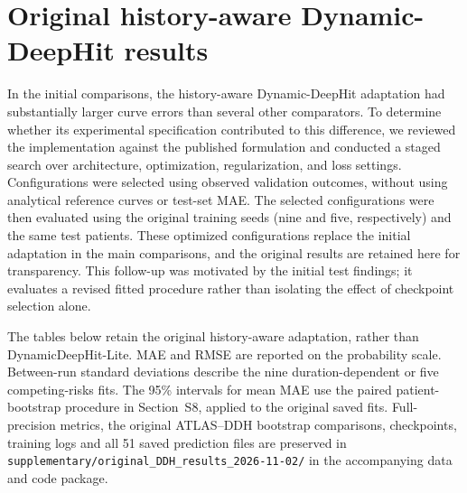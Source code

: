 \section{Original history-aware Dynamic-DeepHit results}\label{app:originalddh}
In the initial comparisons, the history-aware Dynamic-DeepHit adaptation had substantially larger curve errors than several other comparators. To determine whether its experimental specification contributed to this difference, we reviewed the implementation against the published formulation and conducted a staged search over architecture, optimization, regularization, and loss settings. Configurations were selected using observed validation outcomes, without using analytical reference curves or test-set MAE. The selected configurations were then evaluated using the original training seeds (nine and five, respectively) and the same test patients. These optimized configurations replace the initial adaptation in the main comparisons, and the original results are retained here for transparency. This follow-up was motivated by the initial test findings; it evaluates a revised fitted procedure rather than isolating the effect of checkpoint selection alone.

The tables below retain the original history-aware adaptation, rather than DynamicDeepHit-Lite. MAE and RMSE are reported on the probability scale. Between-run standard deviations describe the nine duration-dependent or five competing-risks fits. The 95\% intervals for mean MAE use the paired patient-bootstrap procedure in Section~S8, applied to the original saved fits. Full-precision metrics, the original ATLAS--DDH bootstrap comparisons, checkpoints, training logs and all 51 saved prediction files are preserved in \texttt{supplementary/original\_DDH\_results\_2026-11-02/} in the accompanying data and code package.

